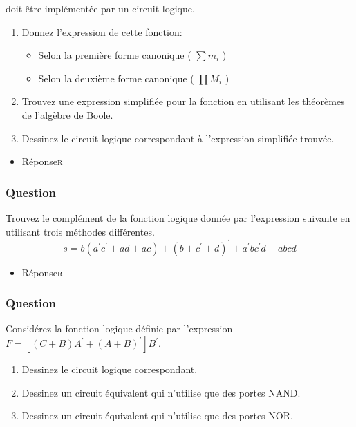 \documentclass[11pt]{article}
\begin{document}
doit être implémentée par un circuit logique.

\begin{enumerate}
\item Donnez l'expression de cette fonction:

\begin{itemize}
\item Selon la première forme canonique ( \(\sum m_i\) )

\item Selon la deuxième forme canonique ( \(\prod M_i\) )
\end{itemize}

\item Trouvez une expression simplifiée pour la fonction en utilisant
les théorèmes de l'algèbre de Boole.

\item Dessinez le circuit logique correspondant à l'expression
simplifiée trouvée.
\end{enumerate}

\begin{itemize}
\item Réponse\hfill{}\textsc{r}
\label{sec:orgd90b582}
\end{itemize}

\subsubsection*{Question}
\label{sec:org4f8fbef}
Trouvez le complément de la fonction logique donnée par l'expression
   suivante en utilisant trois méthodes différentes.
   $$
    s = b (a^{\prime} c^{\prime} + a d + a c) + (b + c^{\prime}+
      d)^{\prime} + a^{\prime} b c^{\prime} d + a b c d
    $$

\begin{itemize}
\item Réponse\hfill{}\textsc{r}
\label{sec:orga616226}
\end{itemize}

\subsubsection*{Question}
\label{sec:orge796b79}
Considérez la fonction logique définie par l'expression \(F =
      [ (C + B) A^{\prime} + (A+B)^{\prime} ] B^{\prime}\).

\begin{enumerate}
\item Dessinez le circuit logique correspondant.

\item Dessinez un circuit équivalent qui n'utilise que des portes
NAND.

\item Dessinez un circuit équivalent qui n'utilise que des portes
NOR.
\end{enumerate}
\end{document}
